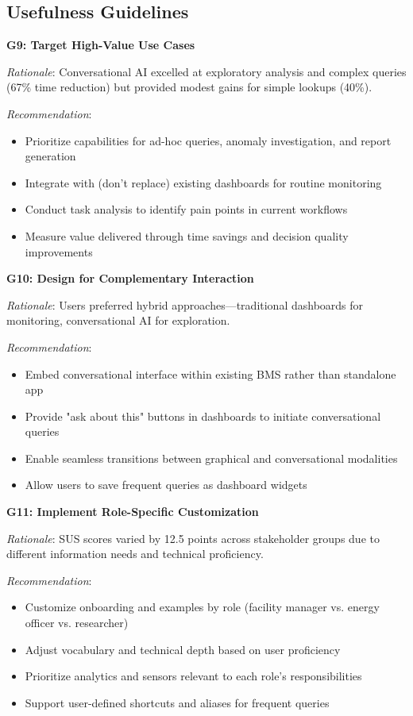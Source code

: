 \documentclass[acmlarge]{acmart}
\begin{document}
\subsection{Usefulness Guidelines}

\textbf{G9: Target High-Value Use Cases}

\textit{Rationale}: Conversational AI excelled at exploratory analysis and complex queries (67\% time reduction) but provided modest gains for simple lookups (40\%).

\textit{Recommendation}:
\begin{itemize}
    \item Prioritize capabilities for ad-hoc queries, anomaly investigation, and report generation
    \item Integrate with (don't replace) existing dashboards for routine monitoring
    \item Conduct task analysis to identify pain points in current workflows
    \item Measure value delivered through time savings and decision quality improvements
\end{itemize}

\textbf{G10: Design for Complementary Interaction}

\textit{Rationale}: Users preferred hybrid approaches—traditional dashboards for monitoring, conversational AI for exploration.

\textit{Recommendation}:
\begin{itemize}
    \item Embed conversational interface within existing BMS rather than standalone app
    \item Provide "ask about this" buttons in dashboards to initiate conversational queries
    \item Enable seamless transitions between graphical and conversational modalities
    \item Allow users to save frequent queries as dashboard widgets
\end{itemize}

\textbf{G11: Implement Role-Specific Customization}

\textit{Rationale}: SUS scores varied by 12.5 points across stakeholder groups due to different information needs and technical proficiency.

\textit{Recommendation}:
\begin{itemize}
    \item Customize onboarding and examples by role (facility manager vs. energy officer vs. researcher)
    \item Adjust vocabulary and technical depth based on user proficiency
    \item Prioritize analytics and sensors relevant to each role's responsibilities
    \item Support user-defined shortcuts and aliases for frequent queries
\end{itemize}
\end{document}
